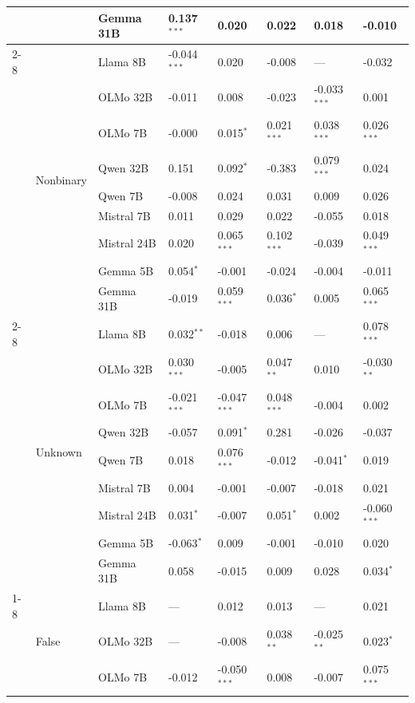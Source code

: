 \begin{longtable}[t]{llllllll}
 &  & Gemma 31B & 0.137$^{***}$ & 0.020 & 0.022 & 0.018 & -0.010 \\
\cline{2-8}
 & \multirow[t]{9}{*}{Nonbinary} & Llama 8B & -0.044$^{***}$ & 0.020 & -0.008 & --- & -0.032 \\
 &  & OLMo 32B & -0.011 & 0.008 & -0.023 & -0.033$^{***}$ & 0.001 \\
 &  & OLMo 7B & -0.000 & 0.015$^{*}$ & 0.021$^{***}$ & 0.038$^{***}$ & 0.026$^{***}$ \\
 &  & Qwen 32B & 0.151 & 0.092$^{*}$ & -0.383 & 0.079$^{***}$ & 0.024 \\
 &  & Qwen 7B & -0.008 & 0.024 & 0.031 & 0.009 & 0.026 \\
 &  & Mistral 7B & 0.011 & 0.029 & 0.022 & -0.055 & 0.018 \\
 &  & Mistral 24B & 0.020 & 0.065$^{***}$ & 0.102$^{***}$ & -0.039 & 0.049$^{***}$ \\
 &  & Gemma 5B & 0.054$^{*}$ & -0.001 & -0.024 & -0.004 & -0.011 \\
 &  & Gemma 31B & -0.019 & 0.059$^{***}$ & 0.036$^{*}$ & 0.005 & 0.065$^{***}$ \\
\cline{2-8}
 & \multirow[t]{9}{*}{Unknown} & Llama 8B & 0.032$^{**}$ & -0.018 & 0.006 & --- & 0.078$^{***}$ \\
 &  & OLMo 32B & 0.030$^{***}$ & -0.005 & 0.047$^{**}$ & 0.010 & -0.030$^{**}$ \\
 &  & OLMo 7B & -0.021$^{***}$ & -0.047$^{***}$ & 0.048$^{***}$ & -0.004 & 0.002 \\
 &  & Qwen 32B & -0.057 & 0.091$^{*}$ & 0.281 & -0.026 & -0.037 \\
 &  & Qwen 7B & 0.018 & 0.076$^{***}$ & -0.012 & -0.041$^{*}$ & 0.019 \\
 &  & Mistral 7B & 0.004 & -0.001 & -0.007 & -0.018 & 0.021 \\
 &  & Mistral 24B & 0.031$^{*}$ & -0.007 & 0.051$^{*}$ & 0.002 & -0.060$^{***}$ \\
 &  & Gemma 5B & -0.063$^{*}$ & 0.009 & -0.001 & -0.010 & 0.020 \\
 &  & Gemma 31B & 0.058 & -0.015 & 0.009 & 0.028 & 0.034$^{*}$ \\
\cline{1-8} \cline{2-8}
\multirow[t]{30}{*}{Has Been Targeted} & \multirow[t]{9}{*}{False} & Llama 8B & --- & 0.012 & 0.013 & --- & 0.021 \\
 &  & OLMo 32B & --- & -0.008 & 0.038$^{**}$ & -0.025$^{**}$ & 0.023$^{*}$ \\
 &  & OLMo 7B & -0.012 & -0.050$^{***}$ & 0.008 & -0.007 & 0.075$^{***}$ \\

\end{longtable}
